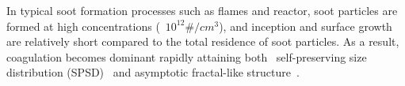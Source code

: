 In typical soot formation processes such as flames and reactor, soot particles are formed at high concentrations (~$10^{12} \#/cm^3$), and inception and surface growth are relatively short compared to the total residence of soot particles. As a result, coagulation becomes dominant rapidly attaining both~\citep{Goudeli2016}
self-preserving size distribution (SPSD)~\citep{lai1972self} and asymptotic fractal-like structure~\citep{mountain1986simulation}.


% 




